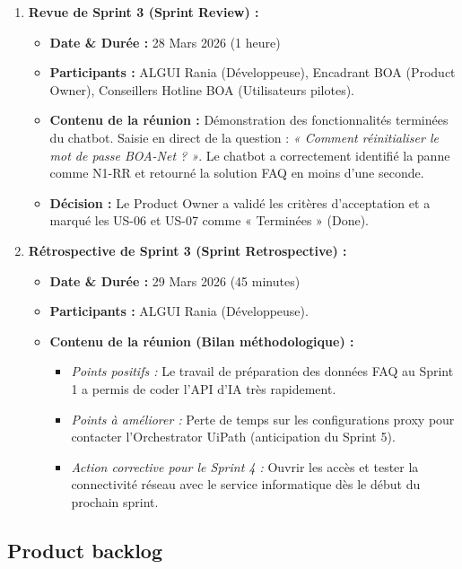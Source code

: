 \begin{enumerate}
    \item \textbf{Revue de Sprint 3 (Sprint Review) :}
    \begin{itemize}
        \item \textbf{Date \& Durée :} 28 Mars 2026 (1 heure)
        \item \textbf{Participants :} ALGUI Rania (Développeuse), Encadrant BOA (Product Owner), Conseillers Hotline BOA (Utilisateurs pilotes).
        \item \textbf{Contenu de la réunion :} Démonstration des fonctionnalités terminées du chatbot. Saisie en direct de la question : \textit{« Comment réinitialiser le mot de passe BOA-Net ? »}. Le chatbot a correctement identifié la panne comme N1-RR et retourné la solution FAQ en moins d'une seconde.
        \item \textbf{Décision :} Le Product Owner a validé les critères d'acceptation et a marqué les US-06 et US-07 comme « Terminées » (Done).
    \end{itemize}

    \item \textbf{Rétrospective de Sprint 3 (Sprint Retrospective) :}
    \begin{itemize}
        \item \textbf{Date \& Durée :} 29 Mars 2026 (45 minutes)
        \item \textbf{Participants :} ALGUI Rania (Développeuse).
        \item \textbf{Contenu de la réunion (Bilan méthodologique) :}
        \begin{itemize}
            \item \textit{Points positifs :} Le travail de préparation des données FAQ au Sprint 1 a permis de coder l'API d'IA très rapidement.
            \item \textit{Points à améliorer :} Perte de temps sur les configurations proxy pour contacter l'Orchestrator UiPath (anticipation du Sprint 5).
            \item \textit{Action corrective pour le Sprint 4 :} Ouvrir les accès et tester la connectivité réseau avec le service informatique dès le début du prochain sprint.
        \end{itemize}
    \end{itemize}
\end{enumerate}


\subsection{Product backlog}
\label{subsec:product_backlog}

